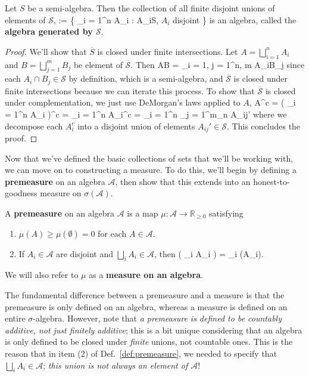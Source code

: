 \begin{theorem}
	Let $S$ be a semi-algebra. Then the collection of all finite disjoint unions of elements of $\mathcal S$,
	\eq
		 := \left\{ \bigsqcup_{i = 1}^n A_i : A_i\in\mathcal S, \textnormal{ $A_i$ disjoint} \right \}
	\qe
	is an algebra, called the \textbf{algebra generated by $\mathcal S$}.
\end{theorem}
\begin{proof}
	We'll show that $\overline S$ is closed under finite intersections. Let $A = \bigsqcup_{i = 1}^n A_i$ and $B = \bigsqcup_{j = 1}^m B_j$ be element of $\overline{\mathcal S}$. Then
	\eq
		A\cap B = \prod_{i = 1, j = 1}^{n, m} A_i\cap B_j\in{}
	\qe
	since each $A_i\cap B_j\in\mathcal S$ by definition, which is a semi-algebra, and $\overline{\mathcal S}$ is closed under finite intersections because we can iterate this process. To show that $\overline{\mathcal S}$ is closed under complementation, we just use DeMorgan's laws applied to $A$,
	\eq
		A^c = \left( \bigsqcup_{i = 1}^n A_i \right)^c = \bigcap_{i = 1}^n A_i^c = \bigcap_{i = 1}^n \bigsqcup_{j = 1}^{m_n} A_{ij}' \in {}
	\qe
	where we decompose each $A_i^c$ into a disjoint union of elements $A_{ij}'\in\mathcal S$. This concludes the proof. 
\end{proof}

Now that we've defined the basic collections of sets that we'll be working with, we can move on to constructing a measure. To do this, we'll begin by defining a \textbf{premeasure} on an algebra $\mathcal A$, then show that this extends into an honest-to-goodness measure on $\sigma(\mathcal A)$. 

\begin{definition}[Premeasure]
	A \textbf{premeasure} on an algebra $\mathcal A$ is a map $\mu : \mathcal A\rightarrow\mathbb R_{\geq 0}$ satisfying
	\begin{enumerate}
		\item $\mu(A)\geq \mu(\emptyset) = 0$ for each $A\in\mathcal A$. 
		\item If $A_i\in\mathcal A$ are disjoint and $\bigsqcup_i A_i\in\mathcal A$, then
		\eq
			\mu\left( \bigsqcup_i A_i \right) = \sum_i \mu(A_i).
		\qe
	\end{enumerate}
	We will also refer to $\mu$ as a \textbf{measure on an algebra}. 
	\label{def:premeasure}
\end{definition}

The fundamental difference between a premeasure and a measure is that the premeasure is only defined on an algebra, whereas a measure is defined on an entire $\sigma$-algebra. However, note that \textit{a premeasure is defined to be countably additive, not just finitely additive}; this is a bit unique considering that an algebra is only defined to be closed under \textit{finite} unions, not countable ones. This is the reason that in item (2) of Def.~\eqref{def:premeasure}, we needed to specify that $\bigsqcup_i A_i\in\mathcal A$; \textit{this union is not always an element of $\mathcal A$}! 

